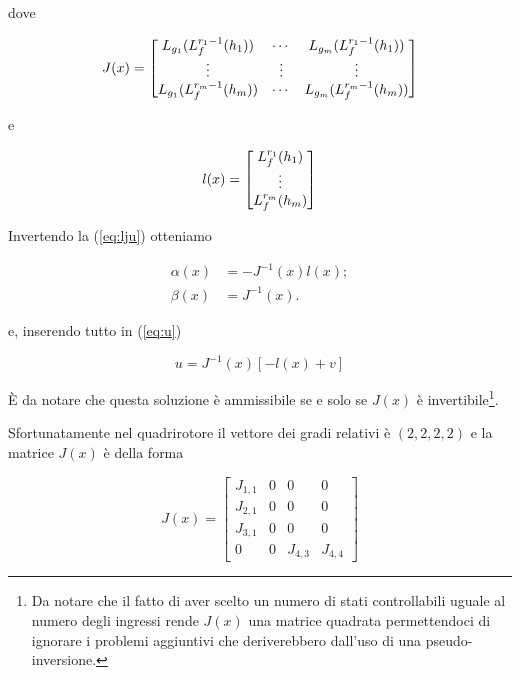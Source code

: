\documentclass[a4paper,10pt]{article}
\begin{document}
dove

\begin{equation}
J(x) = \begin{bmatrix} L_{g_1}(L^{{r}_{\scriptsize{1}}-1}_f(h_1)) & \cdots & L_{g_m}(L^{{r}_{\scriptsize{1}}-1}_f(h_1))\\ \vdots & \vdots & \vdots \\ L_{g_1}(L^{{r}_{\scriptsize{m}}-1}_f(h_m)) & \cdots & L_{g_m}(L^{{r}_{\scriptsize{m}}-1}_f(h_m)) \end{bmatrix}
\end{equation}

e 

\begin{equation}
l({x}) = \begin{bmatrix} L^{{r}_{\scriptsize{1}}}_f(h_1)\\ \vdots \\ L^{{r}_{{\scriptsize{m}}}}_f(h_m) \end{bmatrix}
\end{equation}

Invertendo la (\ref{eq:lju}) otteniamo

\begin{equation}
\begin{split}
\alpha(x) &= -J^{-1}(x)l(x); \\
\beta(x) &= J^{-1}(x).
\end{split}
\end{equation}

e, inserendo tutto in (\ref{eq:u}) 

\begin{equation}
u = J^{-1}(x)[ -l(x) + v]
\label{eq:control_input}
\end{equation}

È da notare che questa soluzione è ammissibile se e solo se $J(x)$ è invertibile\footnote{Da notare che il fatto di aver scelto un numero di stati controllabili uguale al numero degli ingressi rende $J(x)$ una matrice quadrata permettendoci di ignorare i problemi aggiuntivi che deriverebbero dall'uso di una pseudo-inversione.}. 

Sfortunatamente nel quadrirotore il vettore dei gradi relativi è $(2,2,2,2)$ e la matrice $J(x)$ è della forma

\begin{equation}
J(x) = \left[ 
\begin{matrix}
J_{1,1} & 0 & 0 & 0 \\ 
J_{2,1} & 0 & 0 & 0 \\ 
J_{3,1} & 0 & 0 & 0 \\ 
0 & 0 & J_{4,3} & J_{4,4}
\end{matrix}
\right]
\end{equation}
\end{document}
